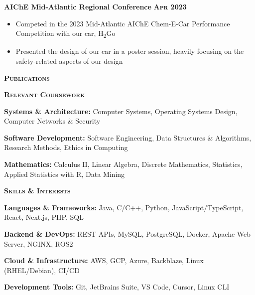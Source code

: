 \documentclass{article}
\newlength{\sectspaceabove}
\newlength{\sectspacebelow}
\newcommand{\textscbf}[1]{\textbf{\textsc{#1}}}
\newcommand{\resumesection}[1]{%
    \vspace{\sectspaceabove}%
    \begin{center}
        \textscbf{#1}
    \end{center}%
    \vspace{\sectspacebelow}%
}
\begin{document}
\textbf{AIChE Mid-Atlantic Regional Conference}  \hfill \textscbf{Apr 2023}
\begin{itemize}[noitemsep,topsep=2pt]
    \item Competed in the 2023 Mid-Atlantic AIChE Chem-E-Car Performance Competition with our car, H\textsubscript{2}Go
    \item Presented the design of our car in a poster session, heavily focusing on the safety-related aspects of our design
\end{itemize}


\resumesection{Publications}

\nocite{*}



\resumesection{Relevant Coursework}

\textbf{Systems \& Architecture:} Computer Systems, Operating Systems Design, Computer Networks \& Security

\textbf{Software Development:} Software Engineering, Data Structures \& Algorithms, Research Methods, Ethics in Computing

\textbf{Mathematics:} Calculus II, Linear Algebra, Discrete Mathematics, Statistics, Applied Statistics with R, Data Mining

\resumesection{Skills \& Interests}

\textbf{Languages \& Frameworks:} Java, C/C++, Python, JavaScript/TypeScript, React, Next.js, PHP, SQL

\textbf{Backend \& DevOps:} REST APIs, MySQL, PostgreSQL, Docker, Apache Web Server, NGINX, ROS2

\textbf{Cloud \& Infrastructure:} AWS, GCP, Azure, Backblaze, Linux (RHEL/Debian), CI/CD

\textbf{Development Tools:} Git, JetBrains Suite, VS Code, Cursor, Linux CLI
\end{document}

